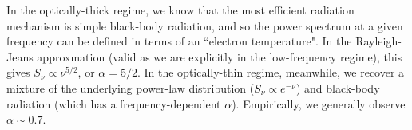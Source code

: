 \pg
In the optically-thick regime, we know that the most efficient radiation mechanism is simple black-body radiation, and so the power spectrum at a given frequency can be defined in terms of an ``electron temperature". In the Rayleigh-Jeans approxmation (valid as we are explicitly in the low-frequency regime), this gives $S_\nu \propto \nu^{5/2}$, or $\alpha=5/2$. 
In the optically-thin regime, meanwhile, we recover a mixture of the underlying power-law distribution ($S_\nu \propto e^{-\nu}$) and black-body radiation (which has a frequency-dependent $\alpha$). Empirically, we generally observe $\alpha \sim 0.7$.


%

